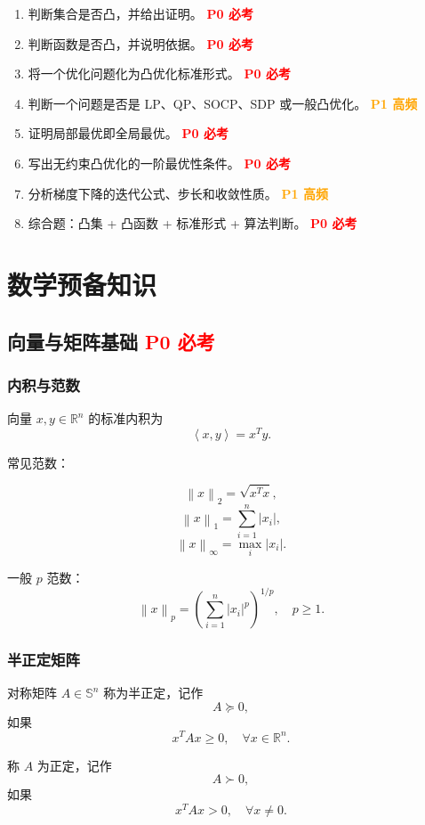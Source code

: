 \documentclass[11pt,a4paper]{ctexart}
\newcommand{\R}{\mathbb{R}}
\newcommand{\Ssym}{\mathbb{S}}
\newcommand{\inner}[2]{\left\langle #1,#2 \right\rangle}
\newcommand{\norm}[1]{\left\lVert #1 \right\rVert}
\newcommand{\Pzero}{\textcolor{red}{\textbf{P0 必考}}}
\newcommand{\Pone}{\textcolor{orange}{\textbf{P1 高频}}}
\theoremstyle{definition}
\theoremstyle{plain}
\theoremstyle{remark}
\begin{document}
\begin{enumerate}[label=\arabic*.]
    \item 判断集合是否凸，并给出证明。 \Pzero
    \item 判断函数是否凸，并说明依据。 \Pzero
    \item 将一个优化问题化为凸优化标准形式。 \Pzero
    \item 判断一个问题是否是 LP、QP、SOCP、SDP 或一般凸优化。 \Pone
    \item 证明局部最优即全局最优。 \Pzero
    \item 写出无约束凸优化的一阶最优性条件。 \Pzero
    \item 分析梯度下降的迭代公式、步长和收敛性质。 \Pone
    \item 综合题：凸集 + 凸函数 + 标准形式 + 算法判断。 \Pzero
\end{enumerate}

\newpage

\section{数学预备知识}

\subsection{向量与矩阵基础 \Pzero}

\subsubsection*{内积与范数}

向量 $x,y\in\R^n$ 的标准内积为
\[
    \inner{x}{y}=x^Ty.
\]

常见范数：

\[
    \norm{x}_2=\sqrt{x^Tx},
\]
\[
    \norm{x}_1=\sum_{i=1}^n |x_i|,
\]
\[
    \norm{x}_\infty=\max_i |x_i|.
\]

一般 $p$ 范数：
\[
    \norm{x}_p
    =
    \left(\sum_{i=1}^n |x_i|^p\right)^{1/p},
    \quad p\ge 1.
\]

\subsubsection*{半正定矩阵}

对称矩阵 $A\in \Ssym^n$ 称为半正定，记作
\[
    A\succeq 0,
\]
如果
\[
    x^TAx\ge 0,\quad \forall x\in\R^n.
\]

称 $A$ 为正定，记作
\[
    A\succ 0,
\]
如果
\[
    x^TAx>0,\quad \forall x\neq 0.
\]
\end{document}
